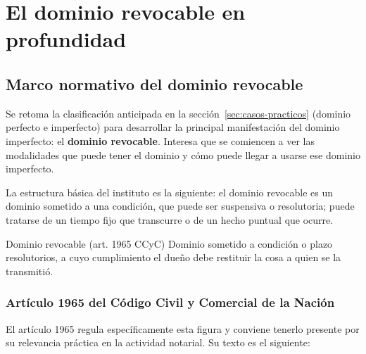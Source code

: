 \documentclass[12pt,oneside]{book}
\begin{document}
\chapter[El dominio revocable]{El dominio revocable en profundidad}
\label{cap:revocable}

\section{Marco normativo del dominio revocable}
\label{sec:marco-revocable}

Se retoma la clasificación anticipada en la sección~\ref{sec:casos-practicos} (dominio perfecto e imperfecto) para desarrollar la principal manifestación del dominio imperfecto: el \textbf{dominio revocable}. Interesa que se comiencen a ver las modalidades que puede tener el dominio y cómo puede llegar a usarse ese dominio imperfecto.

La estructura básica del instituto es la siguiente: el dominio revocable es un dominio sometido a una condición, que puede ser suspensiva o resolutoria; puede tratarse de un tiempo fijo que transcurre o de un hecho puntual que ocurre.


\begin{definition}{Dominio revocable (art. 1965 CCyC)}
Dominio sometido a condición o plazo resolutorios, a cuyo cumplimiento el dueño debe restituir la cosa a quien se la transmitió.
\end{definition}

\subsection{Artículo 1965 del Código Civil y Comercial de la Nación}

El artículo 1965 regula específicamente esta figura y conviene tenerlo presente por su relevancia práctica en la actividad notarial. Su texto es el siguiente:
\end{document}

